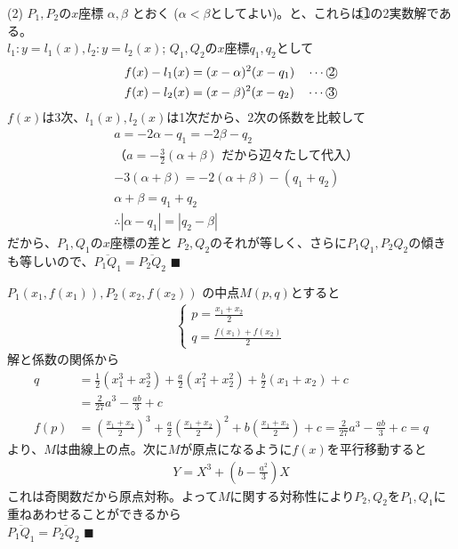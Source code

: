 \documentclass[../main.tex]{subfiles}
\begin{document}
(2) $P_1, P_2$の$x$座標 $\alpha, \beta$ とおく ($\alpha < \beta$としてよい)。と、これらは\textcircled{1}の2実数解である。\\
$l_1 : y=l_1(x), l_2 : y=l_2(x)$; $Q_1, Q_2$の$x$座標$q_1, q_2$として
\begin{align*}
  f(x) - l_1(x) &= (x-\alpha)^2 (x-q_1) \quad \cdots \text{\textcircled{2}} \\
  f(x) - l_2(x) &= (x-\beta)^2 (x-q_2) \quad \cdots \text{\textcircled{3}}
\end{align*}
$f(x)$は3次、$l_1(x), l_2(x)$は1次だから、2次の係数を比較して
\begin{align*}
  & a = -2\alpha - q_1 = -2\beta - q_2 \\
  & \text{（$a = -\frac{3}{2}(\alpha+\beta)$ だから辺々たして代入）} \\
  & -3(\alpha+\beta) = -2(\alpha+\beta) - (q_1+q_2) \\
  & \alpha+\beta = q_1+q_2 \\
  & \therefore |\alpha-q_1| = |q_2-\beta|
\end{align*}
だから、$P_1, Q_1$の$x$座標の差と $P_2, Q_2$のそれが等しく、さらに$P_1Q_1, P_2Q_2$の傾きも等しいので、$\overline{P_1Q_1} = \overline{P_2Q_2}$ \quad $\blacksquare$

\vspace{1ex}
\noindent
[解2] [例の対称性を用いる]

$P_1(x_1, f(x_1)), P_2(x_2, f(x_2))$ の中点$M(p,q)$とすると
\begin{align*}
  \begin{cases}
    p = \frac{x_1+x_2}{2} \\
    q = \frac{f(x_1)+f(x_2)}{2}
  \end{cases}
\end{align*}
解と係数の関係から
\begin{align*}
  q &= \frac{1}{2}(x_1^3+x_2^3) + \frac{a}{2}(x_1^2+x_2^2) + \frac{b}{2}(x_1+x_2) + c \\
  &= \frac{2}{27}a^3 - \frac{ab}{3} + c \\
  f(p) &= \left(\frac{x_1+x_2}{2}\right)^3 + \frac{a}{2}\left(\frac{x_1+x_2}{2}\right)^2 + b\left(\frac{x_1+x_2}{2}\right) + c = \frac{2}{27}a^3 - \frac{ab}{3} + c = q
\end{align*}
より、$M$は曲線上の点。次に$M$が原点になるように$f(x)$を平行移動すると
\begin{align*}
  Y = X^3 + \left(b-\frac{a^2}{3}\right)X
\end{align*}
これは奇関数だから原点対称。よって$M$に関する対称性により$P_2, Q_2$を$P_1, Q_1$に重ねあわせることができるから\\
$\overline{P_1Q_1} = \overline{P_2Q_2}$ \quad $\blacksquare$
\end{document}
